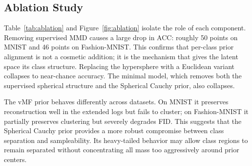 \documentclass[10pt]{article}
\begin{document}
\subsection{Ablation Study}

\begin{table}[t]
\centering
\caption{Ablation study at seed 0 and 50 epochs. MNIST ablation uses an older, pre-alignment training path and should be interpreted relatively. Fashion-MNIST uses the aligned code path.}
\label{tab:ablation}
\end{table}

Table~\ref{tab:ablation} and Figure~\ref{fig:ablation} isolate the role of each component. Removing supervised MMD causes a large drop in ACC: roughly 50 points on MNIST and 46 points on Fashion-MNIST. This confirms that per-class prior alignment is not a cosmetic addition; it is the mechanism that gives the latent space its class structure. Replacing the hypersphere with a Euclidean variant collapses to near-chance accuracy. The minimal model, which removes both the supervised spherical structure and the Spherical Cauchy prior, also collapses.

The vMF prior behaves differently across datasets. On MNIST it preserves reconstruction well in the extended logs but fails to cluster; on Fashion-MNIST it partially preserves clustering but severely degrades FID. This suggests that the Spherical Cauchy prior provides a more robust compromise between class separation and sampleability. Its heavy-tailed behavior may allow class regions to remain separated without concentrating all mass too aggressively around prior centers.
\end{document}
